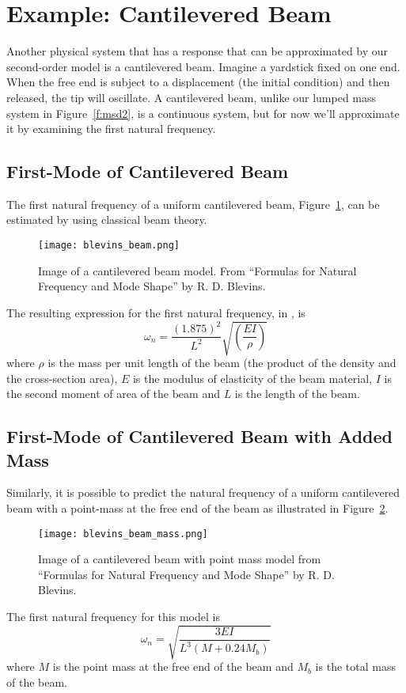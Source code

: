 
\section{Example: Cantilevered Beam}
Another physical system that has a response that can be approximated by our second-order model is a cantilevered beam.  Imagine a yardstick fixed on one end.  When the free end is subject to a displacement (the initial condition) and then released, the tip will oscillate.  A cantilevered beam, unlike our lumped mass system in Figure~\ref{f:msd2}, is a continuous system, but for now we'll approximate it by examining the first natural frequency.  

\subsection{First-Mode of Cantilevered Beam}
The first natural frequency of a uniform cantilevered beam, Figure~\ref{f:blevins}, can be estimated by using classical beam theory.
\begin{figure}[htb!]
\centerline{
{\texttt{[image: blevins\_beam.png]}}}
\caption{Image of a cantilevered beam model.  From ``Formulas for Natural Frequency and Mode Shape'' by R. D. Blevins.}
\label{f:blevins}
\end{figure}
The resulting expression for the first natural frequency, in , is
\begin{equation}\label{e:blevins}
\omega_n = \frac{(1.875)^2}{L^2} \sqrt{\left( \frac{EI}{\rho} \right)}
\end{equation}
where $\rho$ is the mass per unit length of the beam (the product of the density and the cross-section area), $E$ is the modulus of elasticity of the beam material, $I$ is the second moment of area of the beam and $L$ is the length of the beam. 

\subsection{First-Mode of Cantilevered Beam with Added Mass}
Similarly, it is possible to predict the natural frequency of a uniform cantilevered beam with a point-mass at the free end of the beam as illustrated in Figure~\ref{f:blevinsmass}.
\begin{figure}[htb!]
\centerline{
{\texttt{[image: blevins\_beam\_mass.png]}}}
\caption{Image of a cantilevered beam with point mass model from ``Formulas for Natural Frequency and Mode Shape'' by R. D. Blevins.}
\label{f:blevinsmass}
\end{figure}
The first natural frequency for this model is
\begin{equation}\label{e:blevinsmass}
\omega_n = \sqrt{ \frac{3 E I}{L^3 (M+0.24 M_b)}}
\end{equation}
where $M$ is the point mass at the free end of the beam and $M_b$ is the total mass of the beam.

